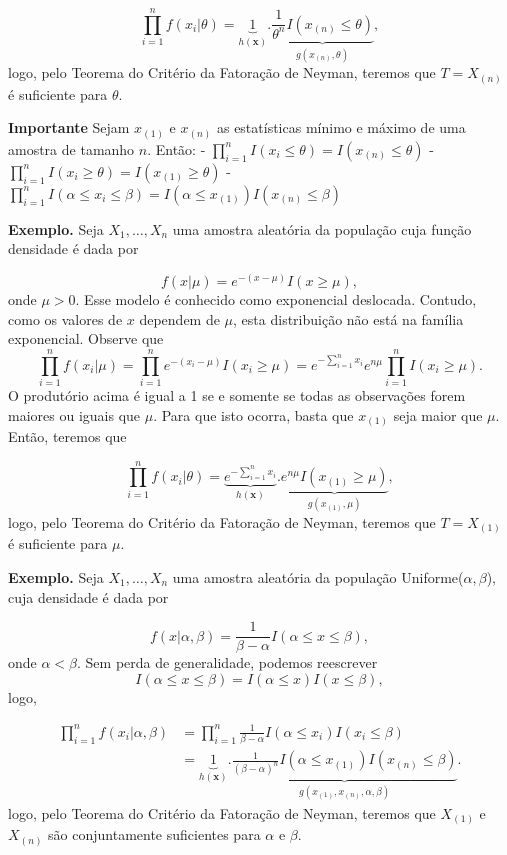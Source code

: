 \documentclass[
  letterpaper,
  DIV=11,
  numbers=noendperiod]{scrartcl}
\begin{document}
\[\prod_{i=1}^nf(x_i|\theta)=\underbrace{1}_{h(\textbf{x})}.\underbrace{\frac{1}{\theta^n}I(x_{(n)}\leq\theta)}_{g(x_{(n)},\theta)},\]
logo, pelo Teorema do Critério da Fatoração de Neyman, teremos que
\(T=X_{(n)}\) é suficiente para \(\theta\).

\textbf{Importante} Sejam \(x_{(1)}\) e \(x_{(n)}\) as estatísticas
mínimo e máximo de uma amostra de tamanho \(n\). Então: -
\(\prod_{i=1}^n I(x_i\leq \theta)=I(x_{(n)}\leq \theta)\) -
\(\prod_{i=1}^n I(x_i\geq \theta)=I(x_{(1)}\geq \theta)\) -
\(\prod_{i=1}^n I(\alpha\leq x_i\leq \beta)=I(\alpha\leq x_{(1)})I(x_{(n)}\leq \beta)\)

\textbf{Exemplo.} Seja \(X_1,\ldots,X_n\) uma amostra aleatória da
população cuja função densidade é dada por

\[f(x|\mu)=e^{-(x-\mu)}I(x\geq \mu),\] onde \(\mu>0\). Esse modelo é
conhecido como exponencial deslocada. Contudo, como os valores de \(x\)
dependem de \(\mu\), esta distribuição não está na família exponencial.
Observe que
\[\prod_{i=1}^n f(x_i|\mu)=\prod_{i=1}^n e^{-(x_i-\mu)}I(x_i\geq \mu)=e^{-\sum_{i=1}^n x_i}e^{n\mu}\prod_{i=1}^{n}I(x_i\geq \mu).\]
O produtório acima é igual a 1 se e somente se todas as observações
forem maiores ou iguais que \(\mu\). Para que isto ocorra, basta que
\(x_{(1)}\) seja maior que \(\mu\). Então, teremos que

\[\prod_{i=1}^nf(x_i|\theta)=\underbrace{e^{-\sum_{i=1}^n x_i}}_{h(\textbf{x})}.\underbrace{e^{n\mu}I(x_{(1)}\geq \mu)}_{g(x_{(1)},\mu)},\]
logo, pelo Teorema do Critério da Fatoração de Neyman, teremos que
\(T=X_{(1)}\) é suficiente para \(\mu\).

\textbf{Exemplo.} Seja \(X_1,\ldots,X_n\) uma amostra aleatória da
população Uniforme(\(\alpha,\beta\)), cuja densidade é dada por

\[f(x|\alpha,\beta)=\frac{1}{\beta-\alpha}I(\alpha\leq x\leq \beta),\]
onde \(\alpha<\beta\). Sem perda de generalidade, podemos reescrever
\[I(\alpha\leq x\leq \beta)=I(\alpha\leq x)I(x\leq\beta),\] logo,

\[\begin{align}\prod_{i=1}^n f(x_i|\alpha,\beta)&=\prod_{i=1}^n \frac{1}{\beta-\alpha}I(\alpha\leq x_i)I(x_i\leq\beta)\\&=\underbrace{1}_{h(\textbf{x})}.\underbrace{\frac{1}{(\beta-\alpha)^n}I(\alpha\leq x_{(1)})I(x_{(n)}\leq\beta)}_{g(x_{(1)},x_{(n)},\alpha,\beta
)}.\end{align}\] logo, pelo Teorema do Critério da Fatoração de Neyman,
teremos que \(X_{(1)}\) e \(X_{(n)}\) são conjuntamente suficientes para
\(\alpha\) e \(\beta\).
\end{document}
